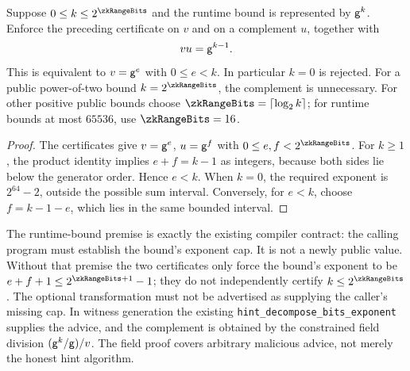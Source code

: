 \begin{proposition}\label{prop:zk-local-range}
Suppose $0\le k\le2^{\zkRangeBits}$ and the runtime bound is represented by $\mathsf{g}^k$. Enforce the preceding certificate on $v$ and on a complement $u$, together with
\[
 vu=\mathsf{g}^{k-1}.
\]
This is equivalent to $v=\mathsf{g}^e$ with $0\le e<k$. In particular $k=0$ is rejected. For a public power-of-two bound $k=2^{\zkRangeBits}$, the complement is unnecessary. For other positive public bounds choose $\zkRangeBits=\lceil\log_2 k\rceil$; for runtime bounds at most $65536$, use $\zkRangeBits=16$.
\end{proposition}
\begin{proof}
The certificates give $v=\mathsf{g}^e$, $u=\mathsf{g}^f$ with $0\le e,f<2^{\zkRangeBits}$. For $k\ge1$, the product identity implies $e+f=k-1$ as integers, because both sides lie below the generator order. Hence $e<k$. When $k=0$, the required exponent is $2^{64}-2$, outside the possible sum interval. Conversely, for $e<k$, choose $f=k-1-e$, which lies in the same bounded interval.
\end{proof}

The runtime-bound premise is exactly the existing compiler contract: the calling program must establish the bound's exponent cap. It is not a newly public value. Without that premise the two certificates only force the bound's exponent to be $e+f+1\le2^{\zkRangeBits+1}-1$; they do not independently certify $k\le2^{\zkRangeBits}$. The optional transformation must not be advertised as supplying the caller's missing cap. In witness generation the existing \texttt{hint\_decompose\_bits\_exponent} supplies the advice, and the complement is obtained by the constrained field division $(\mathsf{g}^k/\mathsf{g})/v$. The field proof covers arbitrary malicious advice, not merely the honest hint algorithm.

